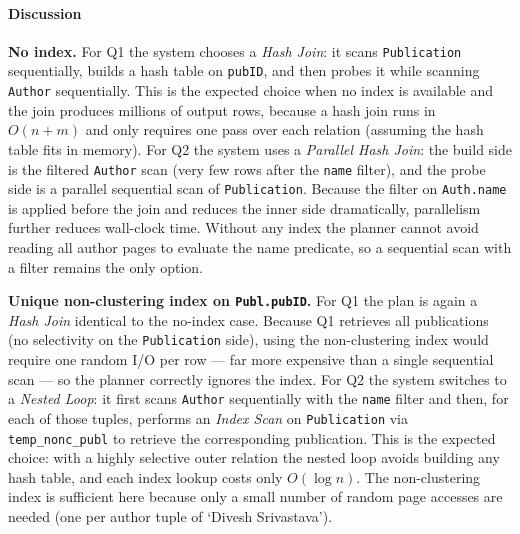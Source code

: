 \documentclass[11pt]{scrartcl}
\begin{document}
\paragraph{Discussion}
\textbf{No index.}
For Q1 the system chooses a \emph{Hash Join}: it scans \texttt{Publication} sequentially, builds a hash table on \texttt{pubID}, and then probes it while scanning \texttt{Author} sequentially.
This is the expected choice when no index is available and the join produces millions of output rows, because a hash join runs in $O(n+m)$ and only requires one pass over each relation (assuming the hash table fits in memory).
For Q2 the system uses a \emph{Parallel Hash Join}: the build side is the filtered \texttt{Author} scan (very few rows after the \texttt{name} filter), and the probe side is a parallel sequential scan of \texttt{Publication}.
Because the filter on \texttt{Auth.name} is applied before the join and reduces the inner side dramatically, parallelism further reduces wall-clock time.
Without any index the planner cannot avoid reading all author pages to evaluate the name predicate, so a sequential scan with a filter remains the only option.

\textbf{Unique non-clustering index on \texttt{Publ.pubID}.}
For Q1 the plan is again a \emph{Hash Join} identical to the no-index case.
Because Q1 retrieves all publications (no selectivity on the \texttt{Publication} side), using the non-clustering index would require one random I/O per row — far more expensive than a single sequential scan — so the planner correctly ignores the index.
For Q2 the system switches to a \emph{Nested Loop}: it first scans \texttt{Author} sequentially with the \texttt{name} filter and then, for each of those tuples, performs an \emph{Index Scan} on \texttt{Publication} via \texttt{temp\_nonc\_publ} to retrieve the corresponding publication.
This is the expected choice: with a highly selective outer relation the nested loop avoids building any hash table, and each index lookup costs only $O(\log n)$.
The non-clustering index is sufficient here because only a small number of random page accesses are needed (one per author tuple of `Divesh Srivastava').
\end{document}
